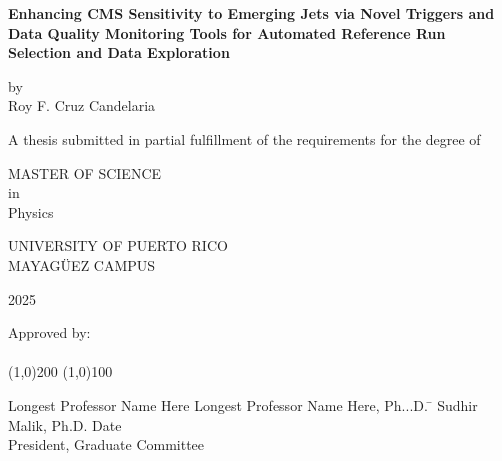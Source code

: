 



\thispagestyle{empty}
\begin{center}
	\begin{singlespace}
		\textbf{Enhancing CMS Sensitivity to Emerging Jets via Novel Triggers and Data Quality Monitoring Tools for Automated Reference Run Selection and Data Exploration}
	\end{singlespace}
	\vspace{4 mm}
	by
	\\
	\vspace{4 mm}
	Roy F. Cruz Candelaria %
	\vspace{4 mm}
	\begin{singlespace}
		A thesis submitted in partial fulfillment of the requirements for the degree of %
	\end{singlespace}
	\vspace{4 mm}
	MASTER OF SCIENCE %
	\\
	in
	\\
	Physics %
	\\
	\vspace{4 mm}
	\begin{singlespace}

		UNIVERSITY OF PUERTO RICO
		\\
		MAYAG\"UEZ CAMPUS
	\end{singlespace}

	2025 %
\end{center}
\bigskip
\bigskip
\bigskip
\bigskip
\bigskip
\bigskip
\bigskip

\noindent Approved by:
\\
\\

\noindent
\line(1,0){200} \hspace{40 mm} \line(1,0){100}\\
\noindent
\vspace{-1.75\baselineskip}
\begin{tabbing}
	Longest Professor Name Here Longest Professor Name Here, Ph...D. \=  \kill
	Sudhir Malik, Ph.D. \>  Date\\President, Graduate Committee  %
\end{tabbing}



